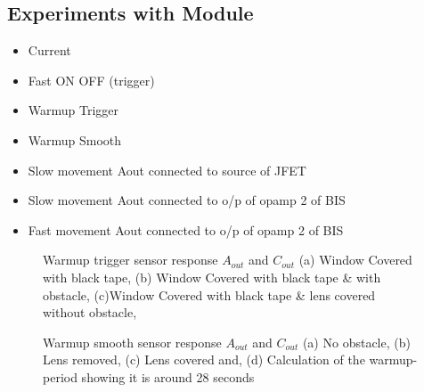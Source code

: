 \subsection{Experiments with Module}
\begin{itemize}
    \item Current
    \item Fast ON OFF (trigger)
    \item Warmup Trigger
    \item Warmup Smooth
    \item Slow movement Aout connected to source of JFET
    \item Slow movement Aout connected to o/p of opamp 2 of BIS
    \item Fast movement Aout connected to o/p of opamp 2 of BIS
\end{itemize}

\begin{figure*}
	\centering
	\caption{Warmup trigger sensor response $A_{out}$ and $C_{out}$ (a) Window Covered with black tape, (b) Window Covered with black tape \& with obstacle, (c)Window Covered with black tape \& lens covered without obstacle,}
	\label{fig:len-covered}
\end{figure*}

\begin{figure*}
	\centering
	\hfill
	\hfill
	\caption{Warmup smooth sensor response $A_{out}$ and $C_{out}$ (a) No obstacle, (b) Lens removed, (c) Lens covered and, (d) Calculation of the warmup-period showing it is around 28 seconds }
	\label{fig:len-covered}
\end{figure*}
   
